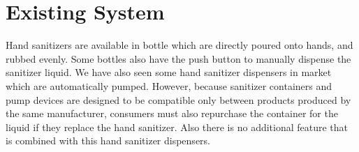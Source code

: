  
 \chapter{Existing System}
 
 \hspace{0.5cm} Hand sanitizers are available in bottle which are directly poured onto hands, and rubbed evenly. Some bottles also have the push button to manually dispense the sanitizer liquid. We have also seen some hand sanitizer dispensers in market which are automatically pumped. However, because sanitizer containers and pump devices are designed to be compatible only between products produced by the same manufacturer, consumers must also repurchase the container for the liquid if they replace the hand sanitizer. Also there is no additional feature that is combined with this hand sanitizer dispensers.
 
  




